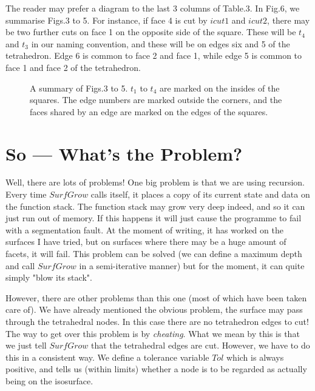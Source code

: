 \documentclass[12pt]{article}
\begin{document}
The reader may prefer a diagram to the last 3 columns of Table.3.
In Fig.6, we summarise Figs.3 to 5. For instance, if face 4 is 
cut by $icut1$ and $icut2$, there may be two further cuts on face
1 on the opposite side of the square. These will be $t_4$ and $t_3$
in our naming convention, and these will be on edges six and 5 of the
tetrahedron. Edge 6 is common to face 2 and face 1, while edge 5 is
common to face 1 and face 2 of the tetrahedron.
\begin{figure}
\vspace*{14cm}
\caption{A summary of Figs.3 to 5. $t_1$ to $t_4$ are marked on the
insides of the squares. The edge numbers are marked outside the corners,
 and the faces shared by an edge are marked on the edges of the squares.}
\end{figure}

\section{So --- What's the Problem?}

Well, there are lots of problems! One big problem is that we are using recursion. Every time $SurfGrow$ calls itself, it places a copy of its current state and data on the function stack. The function stack may grow very deep indeed, and so it can just run out of memory. If this happens it  will just cause the programme to fail with a segmentation fault. At the moment of writing, it has worked on the surfaces I have tried, but on surfaces where there may be a huge amount of facets, it will fail. This problem can be solved (we can define a maximum depth and call $SurfGrow$ in a semi-iterative manner) but for the moment, it can quite simply "blow its stack".

However, there are other problems than this one (most of which have been taken
 care of). We have already  mentioned the obvious problem, the surface may pass
 through the  tetrahedral nodes. In this case there are no tetrahedron edges to cut! The way to get over this problem is by {\it cheating}. What we mean by this is that we just tell $SurfGrow$ that the tetrahedral edges are cut. However, we have to do this in a consistent way. We define a tolerance variable $Tol$ which is always positive, and tells us (within limits) whether a node is to be regarded as actually being on the isosurface.
\end{document}
